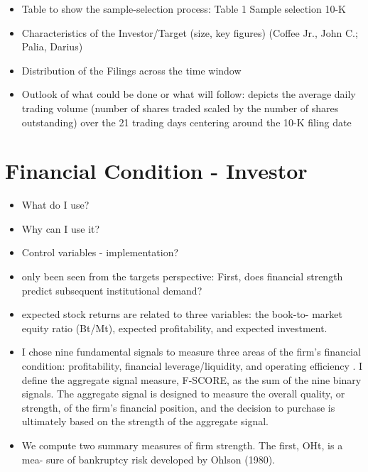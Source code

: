 \documentclass[12pt]{article}
\begin{document}
    \begin{itemize}

        \item Table to show the sample-selection process: Table 1 Sample selection 10-K \citep{You2009}

        \item Characteristics of the Investor/Target (size, key figures) (Coffee Jr., John C.; Palia, Darius)

        \item Distribution of the Filings across the time window

        \item Outlook of what could be done or what will follow: depicts the average daily trading volume (number of shares traded scaled by the number of shares outstanding) over the 21 trading days centering around the 10-K filing date \citep{You2009}

    \end{itemize}

\section{Financial Condition - Investor}

    \begin{itemize}
        \item What do I use? 
        \item Why can I use it?
        \item Control variables - implementation?

        \item only been seen from the targets perspective: First, does financial strength predict subsequent institutional demand? \citep{Choi2012}

        \item expected stock returns are related to three variables: the book-to-
        market equity ratio (Bt/Mt), expected profitability, and expected investment.\citep{Fama2006}
        
        \item I chose nine fundamental signals to measure three areas of the firm's financial condition: profitability, financial leverage/liquidity, and operating efficiency \citep{Piotroski2000}. I define the aggregate signal measure, F-SCORE, as the sum of the nine binary signals. The aggregate signal is designed to measure the overall quality, or strength, of the firm's financial position, and the decision to purchase is ultimately based on the strength of the aggregate signal.

        \item We compute two summary measures of firm strength. The first, OHt, is a mea- sure of bankruptcy risk developed by Ohlson (1980).\citep{Fama2006}

    \end{itemize}
\end{document}
